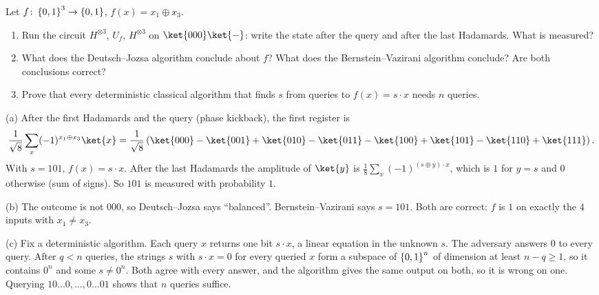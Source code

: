 \begin{question}
    Let $f \colon \left\lbrace0,1\right\rbrace^3 \to \left\lbrace0,1\right\rbrace$, $f(x) = x_1 \oplus x_3$.
    \begin{enumerate}[label=(\alph*)]
        \item Run the circuit $H^{\otimes 3}$, $U_f$, $H^{\otimes 3}$ on $\ket{000}\ket{-}$: write
              the state after the query and after the last Hadamards. What is measured?
        \item What does the Deutsch--Jozsa algorithm conclude about $f$? What does the
              Bernstein--Vazirani algorithm conclude? Are both conclusions correct?
        \item Prove that every deterministic classical algorithm that finds $s$ from queries to
              $f(x) = s \cdot x$ needs $n$ queries.
    \end{enumerate}
\end{question}
\begin{msolution}
    (a) After the first Hadamards and the query (phase kickback), the first register is
    \[\frac{1}{\sqrt{8}} \sum_{x} (-1)^{x_1 \oplus x_3} \ket{x}
        = \frac{1}{\sqrt{8}} \left(\ket{000} - \ket{001} + \ket{010} - \ket{011} - \ket{100} + \ket{101} - \ket{110} + \ket{111}\right).\]
    With $s = 101$, $f(x) = s \cdot x$. After the last Hadamards the amplitude of $\ket{y}$ is
    $\frac{1}{8} \sum_x (-1)^{(s \oplus y) \cdot x}$, which is $1$ for $y = s$ and $0$ otherwise
    (sum of signs). So $101$ is measured with probability $1$.

    (b) The outcome is not $000$, so Deutsch--Jozsa says ``balanced''. Bernstein--Vazirani says
    $s = 101$. Both are correct: $f$ is $1$ on exactly the $4$ inputs with $x_1 \neq x_3$.

    (c) Fix a deterministic algorithm. Each query $x$ returns one bit $s \cdot x$, a linear
    equation in the unknown $s$. The adversary answers $0$ to every query. After $q < n$ queries,
    the strings $s$ with $s \cdot x = 0$ for every queried $x$ form a subspace of $\left\lbrace0,1\right\rbrace^n$
    of dimension at least $n - q \geq 1$, so it contains $0^n$ and some $s \neq 0^n$. Both agree
    with every answer, and the algorithm gives the same output on both, so it is wrong on one.
    Querying $10\dots0, \dots, 0\dots01$ shows that $n$ queries suffice.
\end{msolution}

